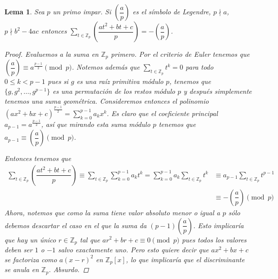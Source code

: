 \documentclass[12pt]{book}
\newtheorem{lem}[teo]{Lema}
\theoremstyle{definition}
\begin{document}
\begin{lem}
Sea $p$ un primo impar. Si $\left(\dfrac{a}{p}\right)$ es el símbolo de Legendre, $p\nmid a$, $p\nmid b^2 - 4ac$ entonces $\displaystyle\sum_{t\in \mathbb{Z}_p} \left(\dfrac{at^2 +bt+c}{p}\right) = -\left(\dfrac{a}{p}\right)$.
\begin{proof}
Evaluemos a la suma en $\mathbb{Z}_p$ primero. Por el criterio de Euler tenemos que $\left(\dfrac{a}{p}\right)\equiv a^{\frac{p-1}{2}}\pmod{p}$. Notemos además que $\displaystyle\sum_{t\in \mathbb{Z}_p} t^k = 0$ para todo $0\leq k < p-1$ pues si $g$ es una raíz primitiva módulo $p$, tenemos que $\{g,g^2,\ldots , g^{p-1}\}$ es una permutación de los restos módulo $p$ y después simplemente tenemos una suma geométrica. Consideremos entonces el polinomio $(ax^2+bx+c)^{\frac{p-1}{2}} = \displaystyle\sum_{k=0}^{p-1} a_k x^k$. Es claro que el coeficiente principal $a_{p-1} = a^{\frac{p-1}{2}}$, así que mirando esta suma módulo $p$ tenemos que $a_{p-1} \equiv \left(\dfrac{a}{p}\right)\pmod{p}$. 

Entonces tenemos que \begin{align*}\displaystyle\sum_{t\in\mathbb{Z}_p} \left(\dfrac{at^2 +bt+c}{p}\right) \equiv \displaystyle\sum_{t\in\mathbb{Z}_p}\sum_{k=0}^{p-1}a_k t^k = \sum_{k=0}^{p-1} a_k \sum_{t\in \mathbb{Z}_p} t^k &\equiv a_{p-1}\sum_{t\in \mathbb{Z}_p}t^{p-1}\\ &\equiv -\left(\dfrac{a}{p}\right) \pmod{p}\end{align*}
Ahora, notemos que como la suma tiene valor absoluto menor o igual a $p$ sólo debemos descartar el caso en el que la suma da $(p-1)\left(\dfrac{a}{p}\right)$. Esto implicaría que hay un único $r\in\mathbb{Z}_p$ tal que $ar^2 + br + c \equiv 0 \pmod{p}$ pues todos los valores deben ser $1$ o $-1$ salvo exactamente uno. Pero esto quiere decir que $ax^2 +bx + c$ se factoriza como $a(x-r)^2$ en $\mathbb{Z}_p[x]$, lo que implicaría que el discriminante se anula en $\mathbb{Z}_p$. Absurdo. 
\end{proof}
\end{lem}
\end{document}
